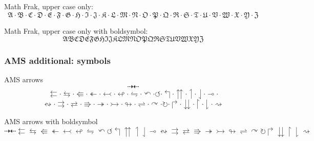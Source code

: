 \documentclass[12pt,a4paper]{article}
\theoremstyle{clearprint}
\begin{document}
\noindent
Math Frak, upper case only:
\begin{equation}
\mathfrak{A} \cdot \mathfrak{B} \cdot \mathfrak{C} \cdot \mathfrak{D} \cdot \mathfrak{E} \cdot \mathfrak{F} \cdot \mathfrak{G} \cdot \mathfrak{H} \cdot \mathfrak{I} \cdot \mathfrak{J} \cdot \mathfrak{K} \cdot \mathfrak{L} \cdot \mathfrak{M} \cdot \mathfrak{N} \cdot \mathfrak{O} \cdot \mathfrak{P} \cdot \mathfrak{Q} \cdot \mathfrak{R} \cdot \mathfrak{S} \cdot \mathfrak{T} \cdot \mathfrak{U} \cdot \mathfrak{V} \cdot \mathfrak{W} \cdot \mathfrak{X} \cdot \mathfrak{Y} \cdot \mathfrak{Z}
\end{equation}

\noindent
Math Frak, upper case only with boldsymbol:
\begin{equation}
\boldsymbol{\mathfrak{A}  \mathfrak{B}  \mathfrak{C}  \mathfrak{D}  \mathfrak{E}  \mathfrak{F}  \mathfrak{G}  \mathfrak{H}  \mathfrak{I}  \mathfrak{J}  \mathfrak{K}  \mathfrak{L}  \mathfrak{M}  \mathfrak{N}  \mathfrak{O}  \mathfrak{P}  \mathfrak{Q}  \mathfrak{R}  \mathfrak{S}  \mathfrak{T}  \mathfrak{U}  \mathfrak{V}  \mathfrak{W}  \mathfrak{X}  \mathfrak{Y}  \mathfrak{Z}}
\end{equation}

\subsubsection[AMS symbols]{AMS additional: symbols}

\noindent 
AMS arrows
\begin{equation}
\dashrightarrow \dashleftarrow 
\end{equation}
\begin{equation}
\leftleftarrows \cdot \leftrightarrows \cdot \Lleftarrow \cdot \twoheadleftarrow \cdot \leftarrowtail \cdot \looparrowleft \cdot \leftrightharpoons \cdot \curvearrowleft \cdot \circlearrowleft \cdot \Lsh \cdot \upuparrows \cdot \upharpoonleft \cdot \downharpoonleft \cdot \multimap \cdot 
\end{equation}
\begin{equation}
\leftrightsquigarrow \cdot 
\rightrightarrows \cdot \rightleftarrows \cdot \Rrightarrow \cdot \twoheadrightarrow \cdot \rightarrowtail \cdot \looparrowright \cdot \rightleftharpoons \cdot \curvearrowright \cdot \circlearrowright \cdot \Rsh \cdot \downdownarrows \cdot \upharpoonright \cdot \downharpoonright \cdot \rightsquigarrow
\end{equation}

AMS arrows with boldsymbol
\begin{equation}
\boldsymbol{\dashrightarrow \dashleftarrow 
\leftleftarrows \leftrightarrows \Lleftarrow \twoheadleftarrow \leftarrowtail \looparrowleft \leftrightharpoons \curvearrowleft \circlearrowleft \Lsh \upuparrows \upharpoonleft \downharpoonleft \multimap 
\leftrightsquigarrow 
\rightrightarrows \rightleftarrows \Rrightarrow \twoheadrightarrow \rightarrowtail \looparrowright \rightleftharpoons \curvearrowright \circlearrowright \Rsh \downdownarrows \upharpoonright \downharpoonright \rightsquigarrow}
\end{equation}
\end{document}
